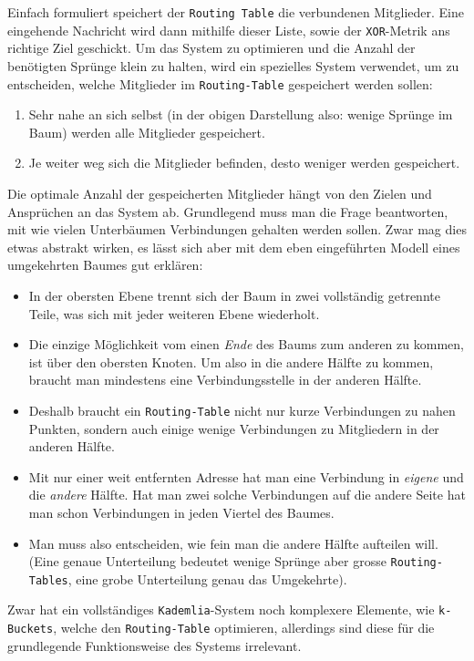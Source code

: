 \documentclass[a4paper,11pt,titlepage,twoside]{memoir}
\begin{document}
\begin{enumerate}
\noindent Einfach formuliert speichert der \texttt{Routing Table} die
verbundenen Mitglieder. Eine eingehende Nachricht wird dann mithilfe
dieser Liste, sowie der \texttt{XOR}-Metrik ans richtige Ziel geschickt. Um das
System zu optimieren und die Anzahl der benötigten Sprünge klein zu
halten, wird ein spezielles System verwendet, um zu entscheiden,
welche Mitglieder im \texttt{Routing-Table} gespeichert werden sollen:

\begin{enumerate}
\item Sehr nahe an sich selbst (in der obigen Darstellung also:
wenige Sprünge im Baum) werden alle Mitglieder gespeichert.
\item Je weiter weg sich die Mitglieder befinden, desto weniger
werden gespeichert.
\end{enumerate}

\noindent Die optimale Anzahl der gespeicherten Mitglieder hängt von
den Zielen und Ansprüchen an das System ab. Grundlegend muss man die
Frage beantworten, mit wie vielen Unterbäumen Verbindungen gehalten
werden sollen. Zwar mag dies etwas abstrakt wirken, es lässt sich aber
mit dem eben eingeführten Modell eines umgekehrten Baumes gut
erklären:
\begin{itemize}
\item In der obersten Ebene trennt sich der Baum in zwei vollständig
getrennte Teile, was sich mit jeder weiteren Ebene wiederholt.
\item Die einzige Möglichkeit vom einen \emph{Ende} des Baums zum anderen
zu kommen, ist über den obersten Knoten. Um also in die andere
Hälfte zu kommen, braucht man mindestens eine Verbindungsstelle
in der anderen Hälfte.
\item Deshalb braucht ein \texttt{Routing-Table} nicht nur kurze
Verbindungen zu nahen Punkten, sondern auch einige wenige
Verbindungen zu Mitgliedern in der anderen Hälfte.
\item Mit nur einer weit entfernten Adresse hat man eine Verbindung
in \emph{eigene} und die \emph{andere} Hälfte. Hat man zwei solche
Verbindungen auf die andere Seite hat man schon Verbindungen in
jeden Viertel des Baumes.
\item Man muss also entscheiden, wie fein man die andere Hälfte
aufteilen will. (Eine genaue Unterteilung bedeutet wenige
Sprünge aber grosse \texttt{Routing-Tables}, eine grobe Unterteilung
genau das Umgekehrte).
\end{itemize}

\noindent Zwar hat ein vollständiges \texttt{Kademlia}-System noch
komplexere Elemente, wie \texttt{k-Buckets}, welche den \texttt{Routing-Table}
optimieren, allerdings sind diese für die grundlegende
Funktionsweise des Systems irrelevant.\\


\end{enumerate}
\end{document}
